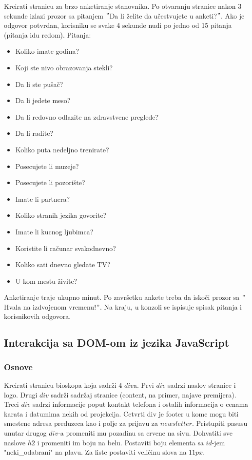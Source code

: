 \begin{primer}
Kreirati stranicu za brzo anketiranje stanovnika. Po otvaranju stranice nakon 3 sekunde izlazi prozor sa pitanjem $"$Da li želite da učestvujete u anketi?$"$. Ako je odgovor potvrdan, korisniku se svake 4 sekunde nudi po jedno od 15 pitanja (pitanja idu redom). Pitanja:
\begin{itemize}
\item Koliko imate godina?
\item Koji ste nivo obrazovanja stekli?
\item Da li ste pušač?
\item Da li jedete meso?
\item Da li redovno odlazite na zdravstvene preglede?
\item Da li radite?
\item Koliko puta nedeljno trenirate?
\item Posecujete li muzeje?
\item Posecujete li pozorište?
\item Imate li partnera?
\item Koliko stranih jezika govorite?
\item Imate li kucnog ljubimca?
\item Koristite li računar svakodnevno?
\item Koliko sati dnevno gledate TV?
\item U kom mestu živite?
\end{itemize}  
Anketiranje traje ukupno minut. Po završetku ankete treba da iskoči prozor sa $"$Hvala na izdvojenom vremenu!$"$. Na kraju, u konzoli se ispisuje spisak pitanja i korisnikovih odgovora. 
\end{primer}

\subsection{Interakcija sa DOM-om iz jezika JavaScript}

\subsubsection{Osnove}
\begin{primer}
Kreirati stranicu bioskopa koja sadrži $4$ $div$a. Prvi $div$ sadrzi naslov stranice i logo. Drugi $div$ sadrži sadržaj stranice (content, na primer, najave premijera). Treci $div$ sadrzi informacije poput kontakt telefona i ostalih informacija o cenama karata i datumima nekih od projekcija. Cetvrti div je footer u kome mogu biti smestene adresa preduzeca kao i polje za prijavu za $newsletter$. Pristupiti pasusu unutar drugog $div$-a promeniti mu pozadinu sa crvene na sivu. Dohvatiti sve naslove $h2$ i promeniti im boju na belu. Postaviti boju elementa sa $id$-jem "neki\_odabrani" na plavu. Za liste postaviti veličinu slova na $11px$. 
\end{primer}

